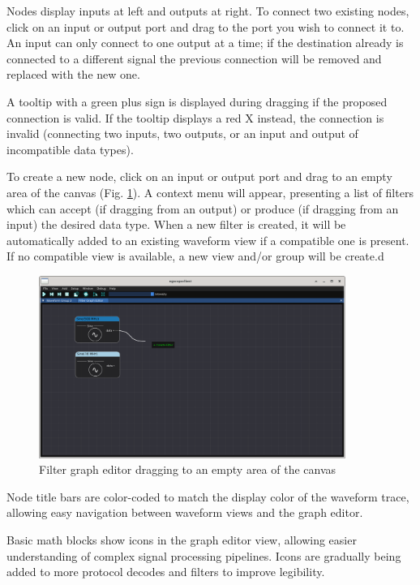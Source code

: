 Nodes display inputs at left and outputs at right. To connect two existing nodes, click on an input or output port and
drag to the port you wish to connect it to. An input can only connect to one output at a time; if the destination
already is connected to a different signal the previous connection will be removed and replaced with the new one.

A tooltip with a green plus sign is displayed during dragging if the proposed connection is valid. If the tooltip
displays a red X instead, the connection is invalid (connecting two inputs, two outputs, or an input and output of
incompatible data types).

To create a new node, click on an input or output port and drag to an empty area of the canvas (Fig.
\ref{graph-editor-create}). A context menu will appear, presenting a list of filters which can accept (if dragging from
an output) or produce (if dragging from an input) the desired data type. When a new filter is created, it will be
automatically added to an existing waveform view if a compatible one is present. If no compatible view is available, a
new view and/or group will be create.d

\begin{figure}[H]
\centering
\includegraphics[width=10cm]{ng-images/graph-editor-create.png}
\caption{Filter graph editor dragging to an empty area of the canvas}
\label{graph-editor-create}
\end{figure}

Node title bars are color-coded to match the display color of the waveform trace, allowing easy navigation between
waveform views and the graph editor.

Basic math blocks show icons in the graph editor view, allowing easier understanding of complex signal processing
pipelines. Icons are gradually being added to more protocol decodes and filters to improve legibility.
